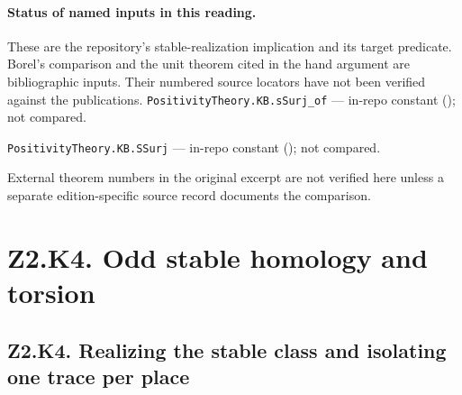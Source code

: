 
\paragraph{Status of named inputs in this reading.}
These are the repository’s stable-realization implication and its target predicate. Borel’s comparison and the unit theorem cited in the hand argument are bibliographic inputs. Their numbered source locators have not been verified against the publications.
\noindent\nolinkurl{PositivityTheory.KB.sSurj_of} --- in-repo constant (); not compared.\par
\noindent\nolinkurl{PositivityTheory.KB.SSurj} --- in-repo constant (); not compared.\par
External theorem numbers in the original excerpt are not verified here unless a separate edition-specific source record documents the comparison.

\section*{Z2.K4. Odd stable homology and torsion}

\subsection{Z2.K4. Realizing the stable class and isolating one trace per place}\label{sec:P-r5-k4}

